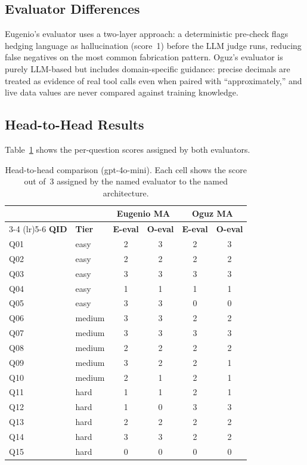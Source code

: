 \documentclass[conference]{IEEEtran}
\begin{document}
\subsection{Evaluator Differences}

Eugenio's evaluator uses a two-layer approach: a deterministic pre-check flags hedging
language as hallucination (score~1) before the LLM judge runs, reducing false negatives
on the most common fabrication pattern.  Oguz's evaluator is purely LLM-based but
includes domain-specific guidance: precise decimals are treated as evidence of real tool
calls even when paired with ``approximately,'' and live data values are never compared
against training knowledge.

\subsection{Head-to-Head Results}

Table~\ref{tab:h2h} shows the per-question scores assigned by both evaluators.

\begin{table}[H]
\centering
\caption{Head-to-head comparison (gpt-4o-mini).  Each cell shows the score out of~3
assigned by the named evaluator to the named architecture.}
\label{tab:h2h}
\small
\begin{tabular}{llcccc}
\toprule
 & & \multicolumn{2}{c}{\textbf{Eugenio MA}} & \multicolumn{2}{c}{\textbf{Oguz MA}} \\
\cmidrule(lr){3-4} \cmidrule(lr){5-6}
\textbf{QID} & \textbf{Tier} & \textbf{E-eval} & \textbf{O-eval} & \textbf{E-eval} & \textbf{O-eval} \\
\midrule
Q01 & easy   & 2 & 3 & 2 & 3 \\
Q02 & easy   & 2 & 2 & 2 & 2 \\
Q03 & easy   & 3 & 3 & 3 & 3 \\
Q04 & easy   & 1 & 1 & 1 & 1 \\
Q05 & easy   & 3 & 3 & 0 & 0 \\
Q06 & medium & 3 & 3 & 2 & 2 \\
Q07 & medium & 3 & 3 & 3 & 3 \\
Q08 & medium & 2 & 2 & 2 & 2 \\
Q09 & medium & 3 & 2 & 2 & 1 \\
Q10 & medium & 2 & 1 & 2 & 1 \\
Q11 & hard   & 1 & 1 & 2 & 1 \\
Q12 & hard   & 1 & 0 & 3 & 3 \\
Q13 & hard   & 2 & 2 & 2 & 2 \\
Q14 & hard   & 3 & 3 & 2 & 2 \\
Q15 & hard   & 0 & 0 & 0 & 0 \\
\bottomrule
\end{tabular}
\end{table}
\end{document}
